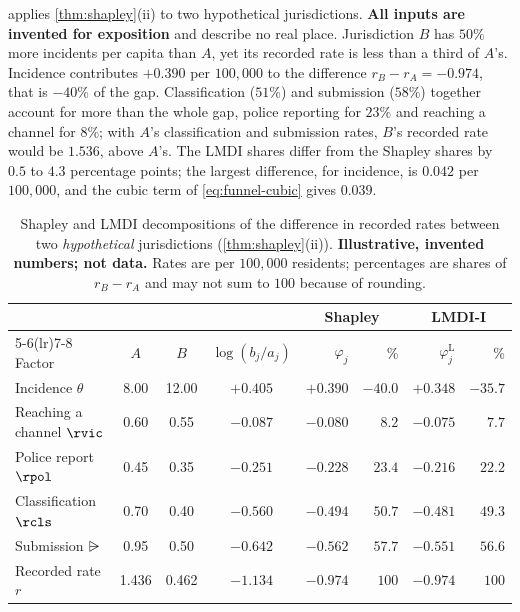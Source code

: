  applies \cref{thm:shapley}(ii) to two hypothetical jurisdictions. \textbf{All inputs are invented for exposition} and describe no real place. Jurisdiction $B$ has $50\%$ more incidents per capita than $A$, yet its recorded rate is less than a third of $A$'s. Incidence contributes $+0.390$ per $100{,}000$ to the difference $r_B-r_A=-0.974$, that is $-40\%$ of the gap. Classification ($51\%$) and submission ($58\%$) together account for more than the whole gap, police reporting for $23\%$ and reaching a channel for $8\%$; with $A$'s classification and submission rates, $B$'s recorded rate would be $1.536$, above $A$'s. The LMDI shares differ from the Shapley shares by $0.5$ to $4.3$ percentage points; the largest difference, for incidence, is $0.042$ per $100{,}000$, and the cubic term of \eqref{eq:funnel-cubic} gives $0.039$.

\begin{table}[t]
\centering
\caption{Shapley and LMDI decompositions of the difference in recorded rates between two \emph{hypothetical} jurisdictions (\cref{thm:shapley}(ii)). \textbf{Illustrative, invented numbers; not data.} Rates are per $100{,}000$ residents; percentages are shares of $r_B-r_A$ and may not sum to $100$ because of rounding.}\label{tab:funnel-illus}
\small
\begin{tabular}{@{}lccc rr rr@{}}
\toprule
 & & & & \multicolumn{2}{c}{Shapley} & \multicolumn{2}{c}{LMDI-I}\\
\cmidrule(lr){5-6}\cmidrule(lr){7-8}
Factor & $A$ & $B$ & $\log(b_j/a_j)$ & $\varphi_j$ & \% & $\varphi^{\mathrm L}_j$ & \% \\
\midrule
Incidence $\theta$       & 8.00 & 12.00 & $+0.405$ & $+0.390$ & $-40.0$ & $+0.348$ & $-35.7$ \\
Reaching a channel $\rvic$ & 0.60 & 0.55  & $-0.087$ & $-0.080$ & $8.2$   & $-0.075$ & $7.7$ \\
Police report $\rpol$    & 0.45 & 0.35  & $-0.251$ & $-0.228$ & $23.4$  & $-0.216$ & $22.2$ \\
Classification $\rcls$   & 0.70 & 0.40  & $-0.560$ & $-0.494$ & $50.7$  & $-0.481$ & $49.3$ \\
Submission $\rsub$       & 0.95 & 0.50  & $-0.642$ & $-0.562$ & $57.7$  & $-0.551$ & $56.6$ \\
\midrule
Recorded rate $r$        & 1.436 & 0.462 & $-1.134$ & $-0.974$ & $100$ & $-0.974$ & $100$ \\
\bottomrule
\end{tabular}
\end{table}

